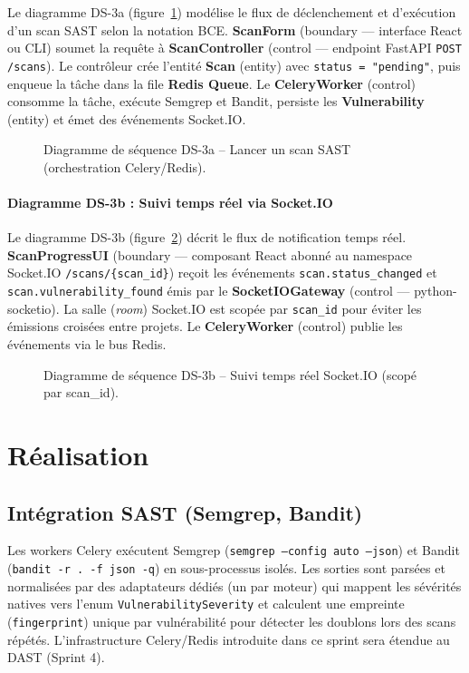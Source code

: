 Le diagramme DS-3a (figure~\ref{fig:sprint3-seq-sast}) modélise le flux de déclenchement et d'exécution d'un scan SAST selon la notation BCE. \textbf{ScanForm} (boundary — interface React ou CLI) soumet la requête à \textbf{ScanController} (control — endpoint FastAPI \texttt{POST /scans}). Le contrôleur crée l'entité \textbf{Scan} (entity) avec \texttt{status = "pending"}, puis enqueue la tâche dans la file \textbf{Redis Queue}. Le \textbf{CeleryWorker} (control) consomme la tâche, exécute Semgrep et Bandit, persiste les \textbf{Vulnerability} (entity) et émet des événements Socket.IO.

\begin{figure}[H]
\centering
\fbox{\rule{0pt}{2in}\rule{0.9\linewidth}{0pt}}
\caption{Diagramme de séquence DS-3a -- Lancer un scan SAST (orchestration Celery/Redis).}
\label{fig:sprint3-seq-sast}
\end{figure}

\paragraph{Diagramme DS-3b : Suivi temps réel via Socket.IO}

Le diagramme DS-3b (figure~\ref{fig:sprint3-seq-socket}) décrit le flux de notification temps réel. \textbf{ScanProgressUI} (boundary — composant React abonné au namespace Socket.IO \texttt{/scans/\{scan\_id\}}) reçoit les événements \texttt{scan.status\_changed} et \texttt{scan.vulnerability\_found} émis par le \textbf{SocketIOGateway} (control — python-socketio). La salle (\textit{room}) Socket.IO est scopée par \texttt{scan\_id} pour éviter les émissions croisées entre projets. Le \textbf{CeleryWorker} (control) publie les événements via le bus Redis.

\begin{figure}[H]
\centering
\fbox{\rule{0pt}{2in}\rule{0.9\linewidth}{0pt}}
\caption{Diagramme de séquence DS-3b -- Suivi temps réel Socket.IO (scopé par scan\_id).}
\label{fig:sprint3-seq-socket}
\end{figure}

\section{Réalisation}

\subsection{Intégration SAST (Semgrep, Bandit)}
Les workers Celery exécutent Semgrep (\texttt{semgrep --config auto --json}) et Bandit (\texttt{bandit -r . -f json -q}) en sous-processus isolés. Les sorties sont parsées et normalisées par des adaptateurs dédiés (un par moteur) qui mappent les sévérités natives vers l'enum \texttt{VulnerabilitySeverity} et calculent une empreinte (\texttt{fingerprint}) unique par vulnérabilité pour détecter les doublons lors des scans répétés. L'infrastructure Celery/Redis introduite dans ce sprint sera étendue au DAST (Sprint 4).

